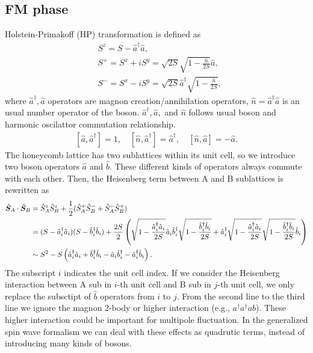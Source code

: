 \documentclass[11pt, aps, longbibliography]{article}
\begin{document}
\subsection{FM phase}
Holstein-Primakoff (HP) transformation is defined as
\begin{align}
    &S^z = S-\hat{a}^{\dagger}\hat{a}, \\
    &S^+ = S^x+iS^y = \sqrt{2S} \sqrt{1-\frac{\hat{n}}{2S}} \hat{a}, \\ 
    &S^- = S^x-iS^y = \sqrt{2S} \hat{a}^{\dagger} \sqrt{1-\frac{\hat{n}}{2S}},
\end{align}
where $\hat{a}^{\dagger}, \hat{a}$ operators are magnon creation/annihilation operators, $\hat{n}=\hat{a}^{\dagger}\hat{a}$ is an usual number operator of the boson.
$\hat{a}^\dagger, \hat{a},$ and $\hat{n}$ follows usual boson and harmonic oscilattor commutation relationship.
\begin{align} 
    \left[ \hat{a}, \hat{a}^\dagger \right] = 1, \quad \left[ \hat{n}, \hat{a}^\dagger \right] = \hat{a}^\dagger, \quad \left[ \hat{n}, \hat{a} \right] = -\hat{a}.
\end{align}
The honeycomb lattice has two sublattices within its unit cell, so we introduce two boson operators $\hat{a}$ and $\hat{b}$.
These different kinds of operators always commute with each other.
Then, the Heisenberg term between A and B sublattices is rewritten as
\begin{align}
    \hat{\bm{S}}_A \cdot \hat{\bm{S}}_B &= \hat{S}_A^z \hat{S}_B^z + \frac{1}{2} (\hat{S}^+_A \hat{S}^-_B + \hat{S}^-_A \hat{S}^+_B)  \notag \\
    &= (S-\hat{a}^\dagger_i \hat{a}_i)(S-\hat{b}^\dagger_i \hat{b}_i) + \frac{2S}{2} \left( \sqrt{1-\frac{\hat{a}^\dagger_i \hat{a}_i}{2S}} \hat{a}_i \hat{b}^{\dagger}_i \sqrt{1-\frac{\hat{b}^\dagger_i \hat{b}_i}{2S}} + \hat{a}^{\dagger}_i \sqrt{1-\frac{\hat{a}^\dagger_i \hat{a}_i}{2S}}   \sqrt{1-\frac{\hat{b}^\dagger_i \hat{b}_i}{2S}} \hat{b}_i  \right) \notag \\
    &\sim S^2 - S\left( \hat{a}^\dagger_i \hat{a}_i + \hat{b}^\dagger_i \hat{b}_i - \hat{a}_i \hat{b}^{\dagger}_i - \hat{a}^\dagger_i \hat{b}_i \right).
\end{align}
The subscript $i$ indicates the unit cell index. If we consider the Heisenberg interaction between A sub in $i$-th unit cell and B sub in $j$-th unit cell, we only replace the subsctipt of $\hat{b}$ operators from $i$ to $j$.
From the second line to the third line we ignore the magnon 2-body or higher interaction (e.g., $a^\dagger a^\dagger a b$). These higher interaction could be important for 
multipole fluctuation. In the generalized spin wave formalism we can deal with these effects as quadrutic terms, instead of introducing many kinds of bosons.
\end{document}
